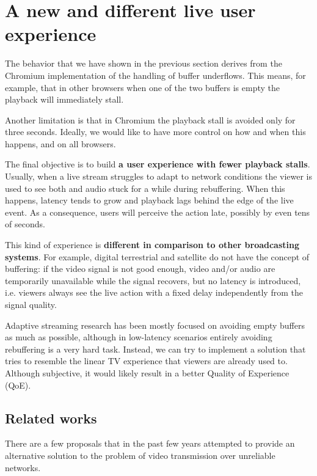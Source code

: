 \section{A new and different live user experience}
\label{sec:improvements/ux}

The behavior that we have shown in the previous section derives from the Chromium implementation of the handling of buffer underflows. This means, for example, that in other browsers when one of the two buffers is empty the playback will immediately stall.

Another limitation is that in Chromium the playback stall is avoided only for three seconds. Ideally, we would like to have more control on how and when this happens, and on all browsers.

The final objective is to build \textbf{a user experience with fewer playback stalls}. Usually, when a live stream struggles to adapt to network conditions the viewer is used to see both and audio stuck for a while during rebuffering. When this happens, latency tends to grow and playback lags behind the edge of the live event. As a consequence, users will perceive the action late, possibly by even tens of seconds.

This kind of experience is \textbf{different in comparison to other broadcasting systems}. For example, digital terrestrial and satellite do not have the concept of buffering: if the video signal is not good enough, video and/or audio are temporarily unavailable while the signal recovers, but no latency is introduced, i.e. viewers always see the live action with a fixed delay independently from the signal quality.

Adaptive streaming research has been mostly focused on avoiding empty buffers as much as possible, although in low-latency scenarios entirely avoiding rebuffering is a very hard task. Instead, we can try to implement a solution that tries to resemble the linear TV experience that viewers are already used to. Although subjective, it would likely result in a better Quality of Experience (QoE).

\subsection{Related works}
\label{sec:improvements/ux/related}

There are a few proposals that in the past few years attempted to provide an alternative solution to the problem of video transmission over unreliable networks.

